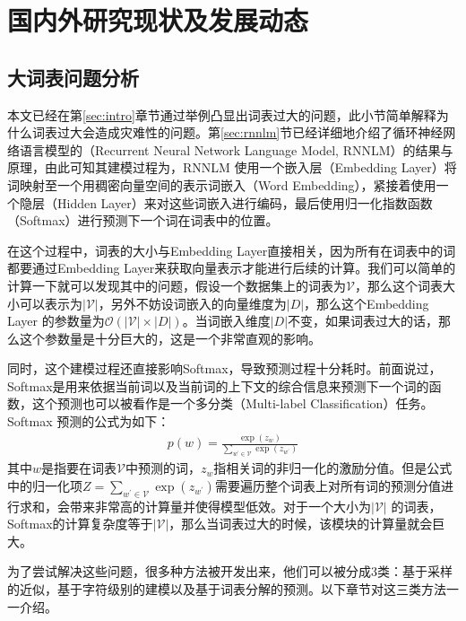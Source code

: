 \documentclass[12pt,a4paper]{article}
\begin{document}
\section{国内外研究现状及发展动态}
\subsection{大词表问题分析}
\label{sec:vocab}
本文已经在第\ref{sec:intro}章节通过举例凸显出词表过大的问题，此小节简单解释为什么词表过大会造成灾难性的问题。第\ref{sec:rnnlm}节已经详细地介绍了循环神经网络语言模型的（Recurrent Neural Network Language Model, RNNLM）的结果与原理，由此可知其建模过程为，RNNLM 使用一个嵌入层（Embedding Layer）将词映射至一个用稠密向量空间的表示词嵌入（Word Embedding），紧接着使用一个隐层（Hidden Layer）来对这些词嵌入进行编码，最后使用归一化指数函数（Softmax）进行预测下一个词在词表中的位置。

在这个过程中，词表的大小与Embedding Layer直接相关，因为所有在词表中的词都要通过Embedding Layer来获取向量表示才能进行后续的计算。我们可以简单的计算一下就可以发现其中的问题，假设一个数据集上的词表为$\mathcal{V}$，那么这个词表大小可以表示为${|\mathcal{V}|}$，另外不妨设词嵌入的向量维度为${|D|}$，那么这个Embedding Layer 的参数量为${\mathcal{O}(|\mathcal{V}| \times |D|)}$。当词嵌入维度${|D|}$不变，如果词表过大的话，那么这个参数量是十分巨大的，这是一个非常直观的影响。

同时，这个建模过程还直接影响Softmax，导致预测过程十分耗时。前面说过，Softmax是用来依据当前词以及当前词的上下文的综合信息来预测下一个词的函数，这个预测也可以被看作是一个多分类（Multi-label Classification）任务。Softmax 预测的公式为如下：
\begin{equation}\label{eq:softmax}
\begin{split}
	p(w)=\frac{\exp(z_w)}{\sum_{w^{'}\in\mathcal{V}} {\exp(z_{w^{'}})}}
\end{split}
\end{equation}
其中$w$是指要在词表$\mathcal{V}$中预测的词，$z_w$指相关词的非归一化的激励分值。但是公式中的归一化项${Z=\sum_{w^{'}\in\mathcal{V}} {\exp(z_{w^{'}})}}$需要遍历整个词表上对所有词的预测分值进行求和，会带来非常高的计算量并使得模型低效。对于一个大小为${|\mathcal{V}|}$ 的词表，Softmax的计算复杂度等于${\mathcal{|\mathcal{V}|}}$，那么当词表过大的时候，该模块的计算量就会巨大。

为了尝试解决这些问题，很多种方法被开发出来，他们可以被分成3类：基于采样的近似，基于字符级别的建模以及基于词表分解的预测。以下章节对这三类方法一一介绍。
\end{document}
